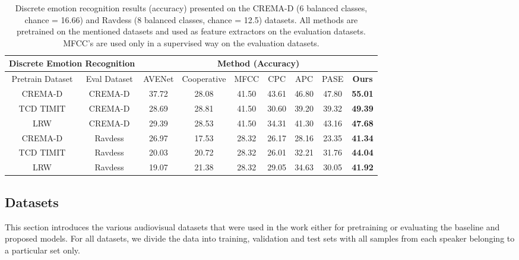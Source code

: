 \documentclass{article}
\begin{document}
\begin{table*}[t]\centering
\small
\begin{tabular}{|c|c|c|c|c|c|c|c|c|}
\hline
\multicolumn{2}{|c|}{\textbf{Discrete Emotion Recognition}} & \multicolumn{7}{c|}{Method (Accuracy)}                                    \\ \hline
Pretrain Dataset               & Eval Dataset               & AVENet \cite{arandjelovic2018objects} & Cooperative \cite{korbar2018cooperative} & MFCC & CPC \cite{oord2018representation} & APC \cite{chung2019unsupervised} & PASE \cite{pascual2019learning} & \textbf{Ours} \\ \hline
CREMA-D                          & CREMA-D                      &  37.72      &   28.08          &  41.50    & 43.61      & 46.80    &  47.80    &   \textbf{55.01}            \\
TCD TIMIT                      & CREMA-D                      &  28.69      &   28.81          &  41.50       &  30.60   & 39.20    &  39.32    &   \textbf{49.39}            \\
LRW                            & CREMA-D                      &  29.39      &   28.53          &  41.50       &  34.31      & 41.30    &  43.16    &  \textbf{47.68}             \\ \hline
CREMA-D                          & Ravdess                    &  26.97      &   17.53          &  28.32       &  26.17     & 28.16    & 23.35     &  \textbf{41.34}            \\
TCD TIMIT                      & Ravdess                    &  20.03      &   20.72          &  28.32       &  26.01  & 32.21    & 31.76     &   \textbf{44.04}           \\
LRW                            & Ravdess                    &  19.07      &   21.38          &  28.32       &  29.05      & 34.63    & 30.05     &  \textbf{41.92}             \\ \hline
\end{tabular}

\caption{Discrete emotion recognition results (accuracy) presented on the CREMA-D (6 balanced classes, chance = 16.66) and Ravdess (8 balanced classes, chance = 12.5) datasets. All methods are pretrained on the mentioned datasets and used as feature extractors on the evaluation datasets. MFCC's are used only in a supervised way on the evaluation datasets.}
\label{tab:emotion}
\end{table*}
\subsection{Datasets}
\label{ssec:datasets}
This section introduces the various audiovisual datasets that were used in the work either for pretraining or evaluating the baseline and proposed models. For all datasets, we divide the data into training, validation and test sets with all samples from each speaker belonging to a particular set only.
\end{document}
